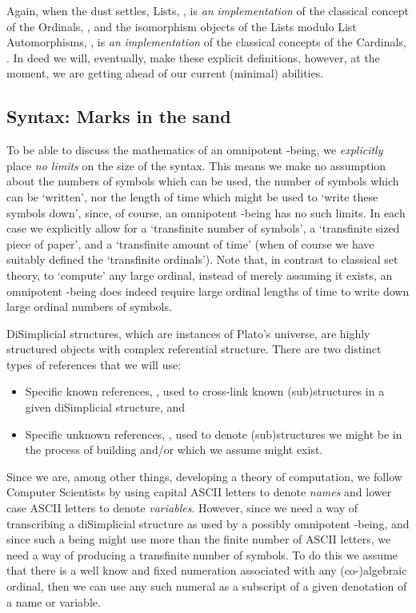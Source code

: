 \documentclass[a4paper,openany]{amsbook}
\begin{document}
Again, when the dust settles, Lists, \Lists, is \emph{an} \emph{implementation}
of the classical concept of the Ordinals, \Ordinal, and the isomorphism objects
of the Lists modulo List Automorphisms, \ListAutomorphisms, is \emph{an}
\emph{implementation} of the classical concepts of the Cardinals, \Cardinal. In
deed we will, eventually, make these explicit definitions, however, at the
moment, we are getting ahead of our current (minimal) abilities.

\subsection{Syntax: Marks in the sand}

To be able to discuss the mathematics of an omnipotent \Cardinal-being, we
\emph{explicitly} place \emph{no limits} on the size of the syntax. This means we
make no assumption about the numbers of symbols which can be used, the number of
symbols which can be `written', nor the length of time which might be used to
`write these symbols down', since, of course, an omnipotent \Cardinal-being has
no such limits. In each case we explicitly allow for a `transfinite number of
symbols', a `transfinite sized piece of paper', and a `transfinite amount of
time' (when of course we have suitably defined the `transfinite ordinals'). Note
that, in contrast to classical set theory, to `compute' any large ordinal,
instead of merely assuming it exists, an omnipotent \Cardinal-being does indeed
require large ordinal lengths of time to write down large ordinal numbers of
symbols.

DiSimplicial structures, which are instances of Plato's universe, are highly
structured objects with complex referential structure. There are two
distinct types of references that we will use: 
%
\begin{itemize}
%
\item Specific known references, , used to cross-link known
(sub)structures in a given diSimplicial structure, and 
%
\item Specific unknown references, , used to denote
(sub)structures we might be in the process of building and/or which we assume
might exist. 
%
\end{itemize}
%

Since we are, among other things, developing a theory of computation, we follow
Computer Scientists by using capital ASCII letters to denote \emph{names} and
lower case ASCII letters to denote \emph{variables}. However, since we need a
way of transcribing a diSimplicial structure as used by a possibly omnipotent
\Cardinal-being, and since such a being might use more than the finite number of
ASCII letters, we need a way of producing a transfinite number of symbols. To do
this we assume that there is a well know and fixed numeration associated with
any (co-)algebraic ordinal, then we can use any such numeral as a subscript of a
given denotation of a name or variable.
\end{document}
